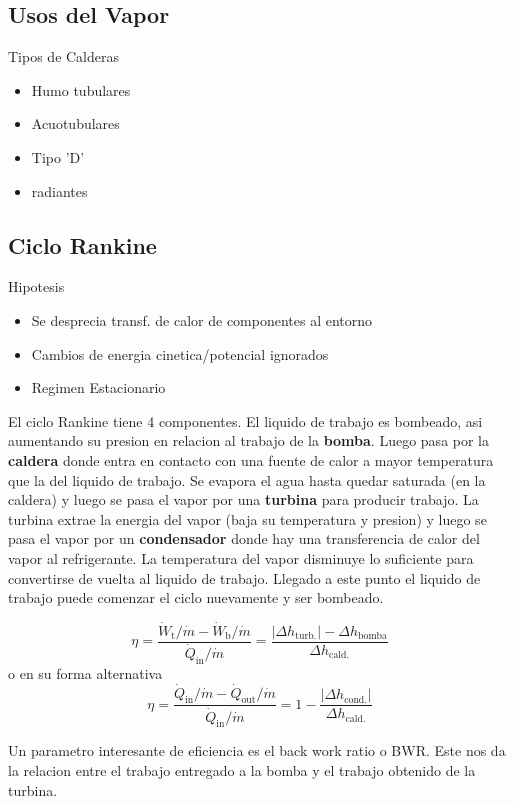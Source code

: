 \documentclass{article}
\begin{document}
\subsection{Usos del Vapor}
Tipos de Calderas
\begin{itemize}
    \item Humo tubulares
    \item Acuotubulares
    \item Tipo 'D'
    \item radiantes
\end{itemize}

\subsection{Ciclo Rankine}
Hipotesis
\begin{itemize}
    \item Se desprecia transf. de calor de componentes al entorno
    \item Cambios de energia cinetica/potencial ignorados
    \item Regimen Estacionario
\end{itemize}


El ciclo Rankine tiene 4 componentes. El liquido de trabajo es bombeado, asi aumentando su presion en relacion al trabajo de la \textbf{bomba}. Luego pasa por la \textbf{caldera} donde entra en contacto con una fuente de calor a mayor temperatura que la del liquido de trabajo. Se evapora el agua hasta quedar saturada (en la caldera) y luego se pasa el vapor por una \textbf{turbina} para producir trabajo. La turbina extrae la energia del vapor (baja su temperatura y presion) y luego se pasa el vapor por un \textbf{condensador} donde hay una transferencia de calor del vapor al refrigerante. La temperatura del vapor disminuye lo suficiente para convertirse de vuelta al liquido de trabajo. Llegado a este punto el liquido de trabajo puede comenzar el ciclo nuevamente y ser bombeado.

\[
\eta=\frac{\dot{W}_{\mathrm{t}} / \dot{m}-\dot{W}_{\mathrm{b}} / \dot{m}}{\dot{Q}_{\mathrm{in}} / \dot{m}}= \frac{ |\Delta h_{\mathrm{turb.}}| - 
\Delta h_{\mathrm{bomba}} }{\Delta h_{\mathrm{cald.}}}
\]
o en su forma alternativa
\[
\eta=\frac{\dot{Q}_{\mathrm{in}} / \dot{m}-\dot{Q}_{\mathrm{out}} / \dot{m}}{\dot{Q}_{\mathrm{in}} / \dot{m}}= 1-\frac{|\Delta h_{\mathrm{cond.}}|}{\Delta h_{\mathrm{cald.}}}
\]

Un parametro interesante de eficiencia es el back work ratio o BWR. Este nos da la relacion entre el trabajo entregado a la bomba y el trabajo obtenido de la turbina.
\end{document}
